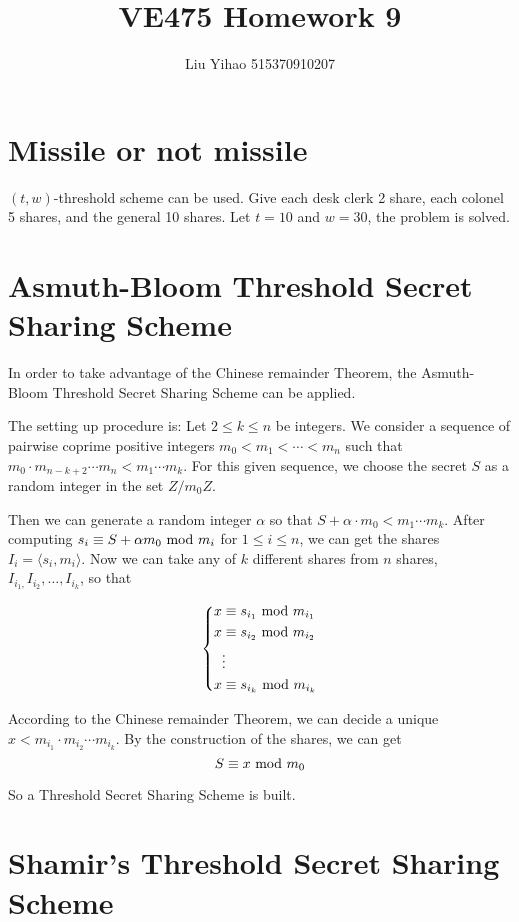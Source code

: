 \documentclass{article}
\title{VE475 Homework 9}
\author{Liu Yihao 515370910207}
\date{}
\renewcommand{\mod}{{\rm\ mod\ }}
\begin{document}
\maketitle

\section{Missile or not missile}

$(t, w)$-threshold scheme can be used. Give each desk clerk 2 share, each colonel 5 shares, and the general 10 shares. Let $t=10$ and $w=30$, the problem is solved.

\section{Asmuth-Bloom Threshold Secret Sharing Scheme}
In order to take advantage of the Chinese remainder Theorem, the Asmuth-Bloom Threshold Secret Sharing Scheme can be applied.

The setting up procedure is: Let $2 \leqslant k \leqslant n$ be integers. We consider a sequence of pairwise coprime positive integers $m_0<m_1<\cdots<m_n$ such that $m_0\cdot m_{n-k+2}\cdots m_n<m_1\cdots m_k$. For this given sequence, we choose the secret $S$ as a random integer in the set $Z/m_0Z$.

Then we can generate a random integer $\alpha$ so that $S+\alpha\cdot m_0<m_1\cdots m_k$. After computing $s_i \equiv S+\alpha m_0 \mod m_i$ for $1\leqslant i\leqslant n$, we can get the shares $I_i=\langle s_i,m_i\rangle$. Now we can take any of $k$ different shares from $n$ shares, $I_{i_1,}I_{i_2},\dots,I_{i_k}$, so that

$$
\left\{\begin{aligned}
x &\equiv s_{i_1} \mod m_{i_1} \\
x &\equiv s_{i_2} \mod m_{i_2} \\
& \vdots \\
x &\equiv s_{i_k} \mod m_{i_k} \\
\end{aligned}\right.
$$

According to the Chinese remainder Theorem, we can decide a unique $x<m_{i_1}\cdot m_{i_2}\cdots m_{i_k}$. By the construction of the shares, we can get $$S \equiv x \mod m_0$$

So a Threshold Secret Sharing Scheme is built.

\section{Shamir's Threshold Secret Sharing Scheme}
\end{document}
